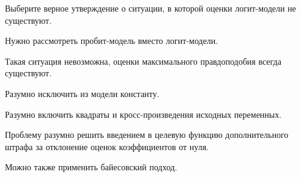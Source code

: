 
\begin{question}
Выберите верное утверждение о ситуации, в которой
оценки логит-модели не существуют.
\begin{answerlist}
  \item Нужно рассмотреть пробит-модель вместо логит-модели.
  \item Такая ситуация невозможна, оценки максимального правдоподобия всегда существуют.
  \item Разумно исключить из модели константу.
  \item Разумно включить квадраты и кросс-произведения исходных переменных.
  \item Проблему разумно решить введением в целевую функцию дополнительного штрафа за отклонение оценок коэффициентов от нуля.
\end{answerlist}
\end{question}

\begin{solution}
Можно также применить байесовский подход.
\end{solution}


